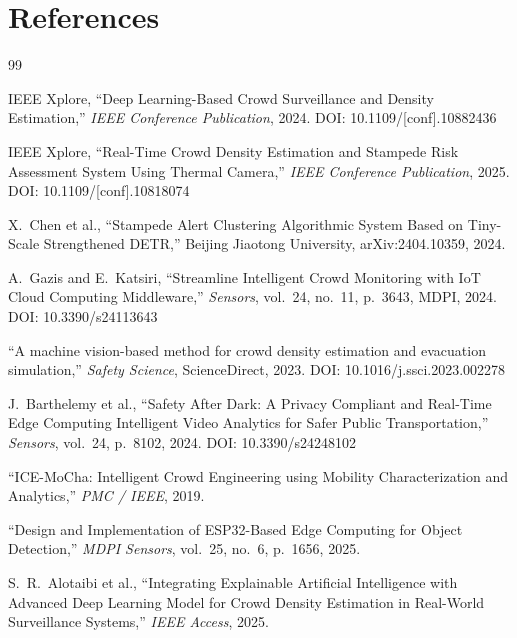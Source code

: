 \documentclass[12pt,a4paper]{article}
\begin{document}
\section*{References}

\begin{thebibliography}{99}

IEEE Xplore, ``Deep Learning-Based Crowd Surveillance and Density Estimation,''
\textit{IEEE Conference Publication}, 2024.
DOI: 10.1109/[conf].10882436

IEEE Xplore, ``Real-Time Crowd Density Estimation and Stampede Risk Assessment System Using Thermal Camera,''
\textit{IEEE Conference Publication}, 2025.
DOI: 10.1109/[conf].10818074

X.~Chen et al., ``Stampede Alert Clustering Algorithmic System Based on Tiny-Scale Strengthened DETR,''
Beijing Jiaotong University, arXiv:2404.10359, 2024.

A.~Gazis and E.~Katsiri, ``Streamline Intelligent Crowd Monitoring with IoT Cloud Computing Middleware,''
\textit{Sensors}, vol.~24, no.~11, p.~3643, MDPI, 2024.
DOI: 10.3390/s24113643

``A machine vision-based method for crowd density estimation and evacuation simulation,''
\textit{Safety Science}, ScienceDirect, 2023.
DOI: 10.1016/j.ssci.2023.002278

J.~Barthelemy et al., ``Safety After Dark: A Privacy Compliant and Real-Time Edge Computing Intelligent Video Analytics for Safer Public Transportation,''
\textit{Sensors}, vol.~24, p.~8102, 2024.
DOI: 10.3390/s24248102

``ICE-MoCha: Intelligent Crowd Engineering using Mobility Characterization and Analytics,''
\textit{PMC / IEEE}, 2019.

``Design and Implementation of ESP32-Based Edge Computing for Object Detection,''
\textit{MDPI Sensors}, vol.~25, no.~6, p.~1656, 2025.

S.~R.~Alotaibi et al., ``Integrating Explainable Artificial Intelligence with Advanced Deep Learning Model for Crowd Density Estimation in Real-World Surveillance Systems,''
\textit{IEEE Access}, 2025.


\end{thebibliography}
\end{document}
